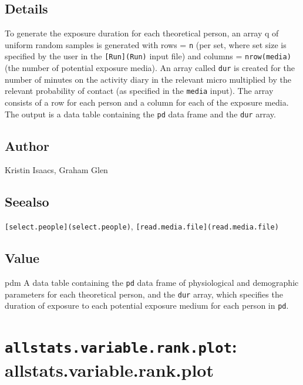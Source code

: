 \documentclass[
]{article}
\begin{document}
\hypertarget{details-3}{%
\subsection{Details}\label{details-3}}

To generate the exposure duration for each theoretical person, an array
q of uniform random samples is generated with rows = \texttt{n} (per
set, where set size is specified by the user in the
\texttt{{[}Run{]}(Run)} input file) and columns = \texttt{nrow(media)}
(the number of potential exposure media). An array called \texttt{dur}
is created for the number of minutes on the activity diary in the
relevant micro multiplied by the relevant probability of contact (as
specified in the \texttt{media} input). The array consists of a row for
each person and a column for each of the exposure media. The output is a
data table containing the \texttt{pd} data frame and the \texttt{dur}
array.

\hypertarget{author-3}{%
\subsection{Author}\label{author-3}}

Kristin Isaacs, Graham Glen

\hypertarget{seealso-3}{%
\subsection{Seealso}\label{seealso-3}}

\texttt{{[}select.people{]}(select.people)},
\texttt{{[}read.media.file{]}(read.media.file)}

\hypertarget{value-3}{%
\subsection{Value}\label{value-3}}

pdm A data table containing the \texttt{pd} data frame of physiological
and demographic parameters for each theoretical person, and the
\texttt{dur} array, which specifies the duration of exposure to each
potential exposure medium for each person in \texttt{pd}.

\hypertarget{allstats.variable.rank.plot-allstats.variable.rank.plot}{%
\section{\texorpdfstring{\texttt{allstats.variable.rank.plot}:
allstats.variable.rank.plot}{allstats.variable.rank.plot: allstats.variable.rank.plot}}\label{allstats.variable.rank.plot-allstats.variable.rank.plot}}
\end{document}
